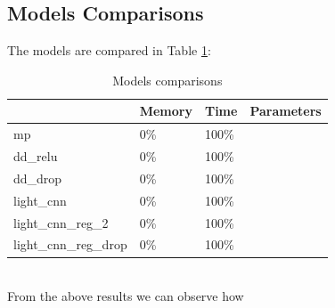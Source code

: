\subsection*{\textbf{Models Comparisons}}
The models are compared in Table \ref{table:comparisons}:\\
\begin{table}[h!]
\centering
\begin{tabular}{ p{3cm}|p{1.5cm}|p{1.5cm}|p{1.5cm} }
 \hline
  & Memory & Time & Parameters \\
\hline\hline
mp & 0\% & 100\% & \\
dd\_relu & 0\% & 100\% & \\
dd\_drop & 0\% & 100\% & \\
light\_cnn & 0\% & 100\% & \\
light\_cnn\_reg\_2 & 0\% & 100\% & \\
light\_cnn\_reg\_drop & 0\% & 100\% & \\
\hline
\end{tabular}
\caption{Models comparisons}
\label{table:comparisons}
\end{table}\\
\noindent From the above results we can observe how {}